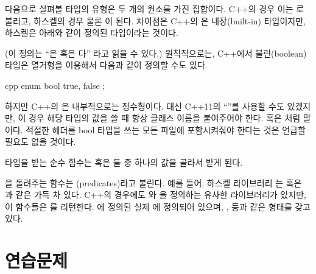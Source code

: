 다음으로 살펴볼 타입의 유형은 두 개의 원소를 가진 집합이다. C++의 경우 이는 로 불리고, 하스켈의 경우 물론 이 된다.
차이점은 C++의 은 내장(built-in) 타입이지만, 하스켈은 아래와 같이 정의된 타입이라는 것이다.

(이 정의는 ``은  혹은 다'' 라고 읽을 수 있다.)
원칙적으로는, C++에서 불린(boolean) 타입은 열거형을 이용해서 다음과 같이 정의할 수도 있다.

\begin{snip}{cpp}
enum bool { 
    true,
    false
};
\end{snip}
하지만 C++의 은 내부적으로는 정수형이다. 대신 C++11의 ``''를 사용할 수도 있겠지만, 이 경우 해당 타입의 값을 쓸 때 항상 클래스 이름을 붙여주어야 한다.
 혹은 처럼 말이다. 적절한 헤더를 bool 타입을 쓰는 모든 파일에 포함시켜줘야 한다는 것은 언급할 필요도 없을 것이다.

 타입을 받는 순수 함수는  혹은  둘 중 하나의 값을 골라서 받게 된다.

을 돌려주는 함수는 \newterm{\trPredicates}(predicates)라고 불린다.
예를 들어, 하스켈 라이브러리 는  혹은 과 같은 \trPredicates\로 가득 차 있다.
C++의 경우에도 와 을 정의하는 유사한 라이브러리가 있지만, 이 함수들은 를 리턴한다.
에 정의된 실제 \trPredicates\는 에 정의되어 있으며, ,  등과 같은 형태를 갖고 있다.

\section{연습문제}

